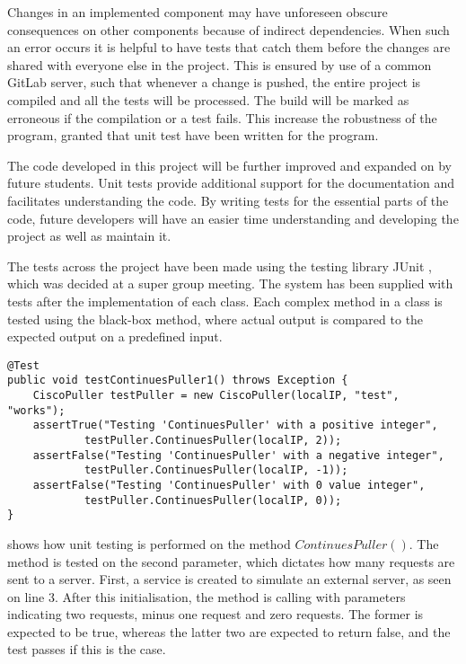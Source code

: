 Changes in an implemented component may have unforeseen obscure consequences on other components because of indirect dependencies. When such an error occurs it is helpful to have tests that catch them before the changes are shared with everyone else in the project. This is ensured by use of a common GitLab server, such that whenever a change is pushed, the entire project is compiled and all the tests will be processed. The build will be marked as erroneous if the compilation or a test fails. This increase the robustness of the program, granted that unit test have been written for the program.

The code developed in this project will be further improved and expanded on by future students. Unit tests provide additional support for the documentation and facilitates understanding the code.
By writing tests for the essential parts of the code, future developers will have an easier time understanding and developing the project as well as maintain it. 

The tests across the project have been made using the testing library JUnit \cite{junit4}, which was decided at a super group meeting. The system has been supplied with tests after the implementation of each class. Each complex method in a class is tested using the black-box method, where actual output is compared to the expected output on a predefined input.

\begin{lstlisting}[caption={Testing ContinuesPuller},label={lst:test_continuespuller},language=inc_Java, mathescape]
@Test
public void testContinuesPuller1() throws Exception {
    CiscoPuller testPuller = new CiscoPuller(localIP, "test", "works");
    assertTrue("Testing 'ContinuesPuller' with a positive integer",
            testPuller.ContinuesPuller(localIP, 2));
    assertFalse("Testing 'ContinuesPuller' with a negative integer",
            testPuller.ContinuesPuller(localIP, -1));
    assertFalse("Testing 'ContinuesPuller' with 0 value integer",
            testPuller.ContinuesPuller(localIP, 0));
}
\end{lstlisting}
 shows how unit testing is performed on the method $ContinuesPuller()$. The method is tested on the second parameter, which dictates how many requests are sent to a server. First, a service is created to simulate an external server, as seen on line 3. After this initialisation, the method is calling with parameters indicating two requests, minus one request and zero requests. The former is expected to be true, whereas the latter two are expected to return false, and the test passes if this is the case. 